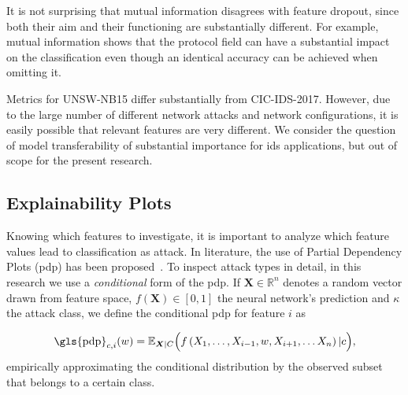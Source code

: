 \documentclass[conference]{IEEEtran}
\begin{document}
It is not surprising that mutual information disagrees with feature dropout, since both their aim and their functioning are substantially different. For example, mutual information shows that the protocol field can have a substantial impact on the classification even though an identical accuracy can be achieved when omitting it.


Metrics for UNSW-NB15 differ substantially from CIC-IDS-2017. However, due to the large number of different network attacks and network configurations, it is easily possible that relevant features are very different. We consider the question of model transferability of substantial importance for \gls{ids} applications, but out of scope for the present research.

\subsection{Explainability Plots}
Knowing which features to investigate, it is important to analyze which feature values lead to classification as attack.
In literature, the use of Partial Dependency Plots (\gls{pdp}) has been proposed~\cite{friedman_greedy_2001}. To inspect attack types in detail, in this research we use a \textit{conditional} form of the \gls{pdp}. If $\boldsymbol X \in \mathbb R ^n$ denotes a random vector drawn from feature space, $f(\boldsymbol X) \in [0,1]$ the neural network's prediction and $\kappa$ the attack class, we define the conditional \gls{pdp} for feature $i$  as

\begin{equation} \label{eq:pdp_conditional}
\text{\gls{pdp}}_{c,i}(w) = \mathbb E_{\boldsymbol X | C} \Big(f \left( X_1,\ldots,X_{i-1},w,X_{i+1},\ldots X_n \right) | c\Big),
\end{equation}
empirically approximating the conditional distribution by the observed subset that belongs to a certain class.
\end{document}
